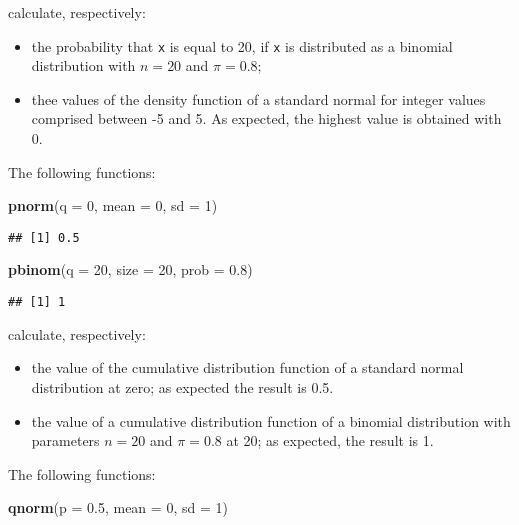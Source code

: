 \documentclass[]{book}
\newenvironment{Shaded}{\begin{snugshade}}{\end{snugshade}}
\newcommand{\KeywordTok}[1]{\textcolor[rgb]{0.13,0.29,0.53}{\textbf{{#1}}}}
\newcommand{\DataTypeTok}[1]{\textcolor[rgb]{0.13,0.29,0.53}{{#1}}}
\newcommand{\DecValTok}[1]{\textcolor[rgb]{0.00,0.00,0.81}{{#1}}}
\newcommand{\FloatTok}[1]{\textcolor[rgb]{0.00,0.00,0.81}{{#1}}}
\newcommand{\NormalTok}[1]{{#1}}
\providecommand{\tightlist}{%
  \setlength{\itemsep}{0pt}\setlength{\parskip}{0pt}}
\def\tightlist{}
\begin{document}
calculate, respectively:

\begin{itemize}
\tightlist
\item
  the probability that \texttt{x} is equal to 20, if \texttt{x} is
  distributed as a binomial distribution with \(n = 20\) and
  \(\pi = 0.8\);
\item
  thee values of the density function of a standard normal for integer
  values comprised between -5 and 5. As expected, the highest value is
  obtained with 0.
\end{itemize}

The following functions:

\begin{Shaded}
\begin{Highlighting}[]
\KeywordTok{pnorm}\NormalTok{(}\DataTypeTok{q =} \DecValTok{0}\NormalTok{, }\DataTypeTok{mean =} \DecValTok{0}\NormalTok{, }\DataTypeTok{sd =} \DecValTok{1}\NormalTok{)}
\end{Highlighting}
\end{Shaded}

\begin{verbatim}
## [1] 0.5
\end{verbatim}

\begin{Shaded}
\begin{Highlighting}[]
\KeywordTok{pbinom}\NormalTok{(}\DataTypeTok{q =} \DecValTok{20}\NormalTok{, }\DataTypeTok{size =} \DecValTok{20}\NormalTok{, }\DataTypeTok{prob =} \FloatTok{0.8}\NormalTok{)}
\end{Highlighting}
\end{Shaded}

\begin{verbatim}
## [1] 1
\end{verbatim}

calculate, respectively:

\begin{itemize}
\tightlist
\item
  the value of the cumulative distribution function of a standard normal
  distribution at zero; as expected the result is 0.5.
\item
  the value of a cumulative distribution function of a binomial
  distribution with parameters \(n = 20\) and \(\pi = 0.8\) at 20; as
  expected, the result is 1.
\end{itemize}

The following functions:

\begin{Shaded}
\begin{Highlighting}[]
\KeywordTok{qnorm}\NormalTok{(}\DataTypeTok{p =} \FloatTok{0.5}\NormalTok{, }\DataTypeTok{mean =} \DecValTok{0}\NormalTok{, }\DataTypeTok{sd =} \DecValTok{1}\NormalTok{)}
\end{Highlighting}
\end{Shaded}
\end{document}

